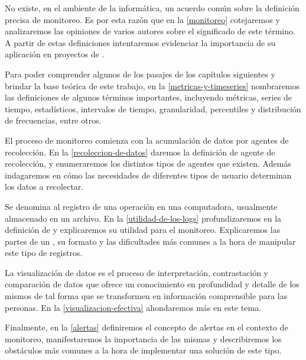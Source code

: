 No existe, en el ambiente de la informática, un acuerdo común sobre la
definición precisa de monitoreo. Es por esta razón que en la \autoref{monitoreo}
cotejaremos y analizaremos las opiniones de varios autores sobre el significado
de este término. A partir de estas definiciones intentaremos evidenciar la
importancia de su aplicación en proyectos de .

Para poder comprender algunos de los pasajes de los capítulos siguientes y
brindar la base teórica de este trabajo, en la \autoref{metricas-y-timeseries}
nombraremos las definiciones de algunos términos importantes, incluyendo
métricas, series de tiempo, estadísticos, intervalos de tiempo, granularidad,
percentiles y distribución de frecuencias, entre otros.

El proceso de monitoreo comienza con la acumulación de datos por agentes de
recolección. En la \autoref{recoleccion-de-datos} daremos la definición
de agente de recolección, y enumeraremos los distintos tipos de agentes que
existen. Además indagaremos en cómo las necesidades de diferentes tipos de
usuario determinan los datos a recolectar.

Se denomina  al registro de una operación en una computadora, usualmente
almacenado en un archivo. En la \autoref{utilidad-de-los-logs} profundizaremos
en la definición de  y explicaremos su utilidad para el monitoreo.
Explicaremos las partes de un , su formato y las dificultades más comunes a
la hora de manipular este tipo de registros.

La visualización de datos es el proceso de interpretación, contrastación y
comparación de datos que ofrece un conocimiento en profundidad y detalle de
los mismos de tal forma que se transformen en información comprensible para las
personas. En la \autoref{visualizacion-efectiva} ahondaremos más en este tema.

Finalmente, en la \autoref{alertas} definiremos el concepto de alertas en el
contexto de monitoreo, manifestaremos la importancia de las mismas y
describiremos los obstáculos más comunes a la hora de implementar una solución
de este tipo.
